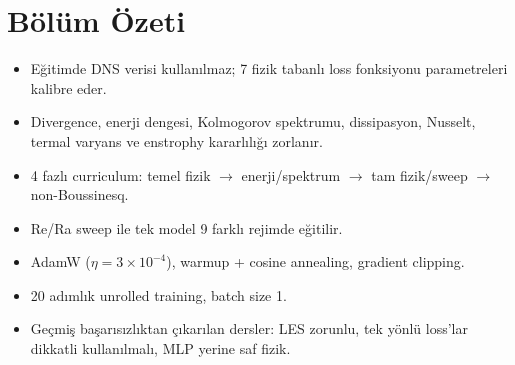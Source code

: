 \section{Bölüm Özeti}
\label{sec:training_ozet}

\begin{itemize}
    \item Eğitimde DNS verisi kullanılmaz; 7 fizik tabanlı loss fonksiyonu parametreleri kalibre eder.
    \item Divergence, enerji dengesi, Kolmogorov spektrumu, dissipasyon, Nusselt, termal varyans ve enstrophy kararlılığı zorlanır.
    \item 4 fazlı curriculum: temel fizik $\to$ enerji/spektrum $\to$ tam fizik/sweep $\to$ non-Boussinesq.
    \item Re/Ra sweep ile tek model 9 farklı rejimde eğitilir.
    \item AdamW ($\eta = 3 \times 10^{-4}$), warmup + cosine annealing, gradient clipping.
    \item 20 adımlık unrolled training, batch size 1.
    \item Geçmiş başarısızlıktan çıkarılan dersler: LES zorunlu, tek yönlü loss'lar dikkatli kullanılmalı, MLP yerine saf fizik.
\end{itemize}
